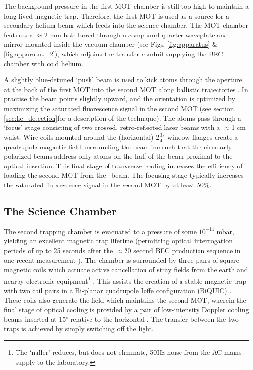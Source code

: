 	The background pressure in the first MOT chamber is still too high to maintain a long-lived magnetic trap.
	Therefore, the first MOT is used as a source for a secondary helium beam which feeds into the science chamber.
	The MOT chamber features a $\approx$2 mm hole bored through a compound quarter-waveplate-and-mirror mounted inside the vacuum chamber (see Figs. \ref{fig:apparatus} \& \ref{fig:apparatus_2}), which adjoins the transfer conduit supplying the BEC chamber with cold helium.

	A slightly blue-detuned `push' beam is used to kick atoms through the aperture at the back of the first MOT into the second MOT along ballistic trajectories \cite{Swansson04}.
	In practise the beam points slightly upward, and the orientation is optimized by maximizing the saturated fluorescence signal in the second MOT (see section \ref{sec:he_detection}for a description of the technique).
	The atoms pass through a `focus' stage consisting of two crossed, retro-reflected laser beams with a $\approx$1 cm waist.
	Wire coils mounted around the (horizontal) 2$\frac{3}{4}$" window flanges create a quadrupole magnetic field surrounding the beamline such that the circularly-polarized beams address only atoms on the half of the beam proximal to the optical insertion.
	This final stage of transverse cooling increases the efficiency of loading the second MOT from the \mhe~beam.
	The focusing stage typically increases the saturated fluorescence signal in the second MOT by at least 50\%.
	

\subsection*{The Science Chamber}

	The second trapping chamber is evacuated to a pressure of some $10^{-11}$ mbar, yielding an excellent magnetic trap lifetime (permitting optical interrogation periods of up to 25 seconds after the $\approx$20 second BEC production sequence in one recent measurement \cite{Thomas20}).
	The chamber is surrounded by three pairs of square magnetic coils which actuate active cancellation of stray fields from the earth and nearby electronic equipment\footnote{The `nuller' reduces, but does not eliminate, 50Hz noise from the AC mains supply to the laboratory.} \cite{Dedman07}.
	This assists the creation of a stable magnetic trap with two coil pairs in a Bi-planar quadrupole Ioffe configuration (BiQUIC) \cite{Dall07}.
	These coils also generate the field which maintains the second MOT, wherein the final stage of optical cooling is provided by a pair of low-intensity Doppler cooling beams inserted at 15$^\circ$ relative to the horizontal \cite{Dall07_BEC}.
	The transfer between the two traps is achieved by simply switching off the light.


